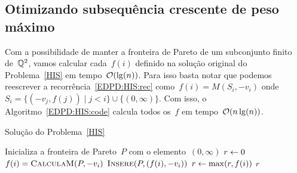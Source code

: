 
\subsection{Otimizando subsequência crescente de peso máximo}

Com a possibilidade de manter a fronteira de Pareto de um subconjunto finito de~$\mathbb{Q}^2$, vamos calcular cada~$f(i)$ definido na solução original do Problema~\ref{HIS} em tempo~$\mathcal{O}(\lg(n))$. Para isso basta notar que podemos reescrever a recorrência~\ref{EDPD:HIS:rec} como~$f(i) = M(S_i,-v_i)$ onde~$S_i = \{(-v_j,f(j)) \mid j < i\} \cup \{(0,\infty)\}$. Com isso, o Algoritmo~\ref{EDPD:HIS:code} calcula todos os~$f$ em tempo~$\mathcal{O}(n\lg(n))$.

\begin{algorithm}[h]
\caption{Solução do Problema~\ref{HIS}}
\label{EDPD:HIS:code}
\begin{algorithmic}[1]
    \State Inicializa a fronteira de Pareto~$P$ com o elemento~$(0,\infty)$
    \State $r \leftarrow 0$
        \State $f(i) = \textsc{CalculaM}(P,-v_i)$
        \State $\textsc{Insere}(P,(f(i),-v_i))$
        \State $r \leftarrow \max(r,f(i))$
    \EndFor
    \State \Return $r$
\EndFunction
\end{algorithmic}
\end{algorithm}
